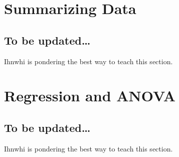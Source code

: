 \documentclass[
]{book}
\begin{document}
\chapter{Summarizing Data}\label{summarizing-data}

\section{To be updated\ldots{}}\label{to-be-updated}

Ihnwhi is pondering the best way to teach this section.

\chapter{Regression and ANOVA}\label{regression-and-anova}

\section{To be updated\ldots{}}\label{to-be-updated-1}

Ihnwhi is pondering the best way to teach this section.

  
\end{document}
